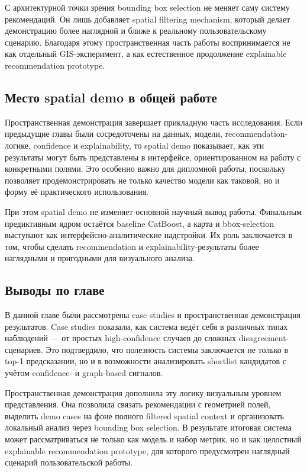 С архитектурной точки зрения bounding box selection не меняет саму систему рекомендаций. Он лишь добавляет spatial
filtering mechanism, который делает демонстрацию более наглядной и ближе к реальному пользовательскому сценарию.
Благодаря этому пространственная часть работы воспринимается не как отдельный GIS-эксперимент, а как естественное
продолжение explainable recommendation prototype.

\subsection{Место spatial demo в общей работе}

Пространственная демонстрация завершает прикладную часть исследования. Если предыдущие главы были сосредоточены на
данных, модели, recommendation-логике, confidence и explainability, то spatial demo показывает, как эти результаты могут
быть представлены в интерфейсе, ориентированном на работу с конкретными полями. Это особенно важно для дипломной работы,
поскольку позволяет продемонстрировать не только качество модели как таковой, но и форму её практического использования.

При этом spatial demo не изменяет основной научный вывод работы. Финальным предиктивным ядром остаётся baseline
CatBoost, а карта и bbox-selection выступают как интерфейсно-аналитические надстройки. Их роль заключается в том, чтобы
сделать recommendation и explainability-результаты более наглядными и пригодными для визуального анализа.

\subsection{Выводы по главе}

В данной главе были рассмотрены case studies и пространственная демонстрация результатов. Case studies показали, как
система ведёт себя в различных типах наблюдений --- от простых high-confidence случаев до сложных
disagreement-сценариев. Это подтвердило, что полезность системы заключается не только в top-1 предсказании, но и в
возможности анализировать shortlist кандидатов с учётом confidence- и graph-based сигналов.

Пространственная демонстрация дополнила эту логику визуальным уровнем представления. Она позволила связать рекомендации
с геометрией полей, выделить demo cases на фоне полного filtered spatial context и организовать локальный анализ через
bounding box selection. В результате итоговая система может рассматриваться не только как модель и набор метрик, но и
как целостный explainable recommendation prototype, для которого предусмотрен наглядный сценарий пользовательской
работы.
